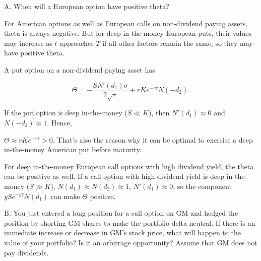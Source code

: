 \begin{problem}{A. When will a European option have positive theta?}
\end{problem}

\begin{solution}
For American options as well as European calls on non-dividend paying assets, theta is
always negative. But for deep in-the-money European puts, their values may increase as
$t$ approaches $T$ if all other factors remain the same, so they may have positive theta.

A put option on a non-dividend paying asset has

\[
\Theta=-\frac{SN'(d_1)\sigma}{2\sqrt{\tau}}+rKe^{-r\tau}N(-d_2).
\]

If the put option is deep in-the-money ($S\ll K$), then $N'(d_1)\approx0$ and
$N(-d_2)\approx1$. Hence,


$\Theta\approx rKe^{-r\tau}>0$. That's also the reason why it can be optimal to exercise a
deep in-the-money American put before maturity.

For deep in-the-money European call options with high dividend yield, the theta can be
positive as well. If a call option with high dividend yield is deep in-the-money
($S\gg K$), $N(d_1)\approx N(d_2)\approx1$, $N'(d_1)\approx0$, so the component
$ySe^{-y\tau}N(d_1)$ can make $\Theta$ positive.

\end{solution}

\begin{problem}{B. You just entered a long position for a call option on GM and hedged the position
by shorting GM shares to make the portfolio delta neutral. If there is an immediate increase
or decrease in GM's stock price, what will happen to the value of your portfolio? Is it an
arbitrage opportunity? Assume that GM does not pay dividends.}
\end{problem}

